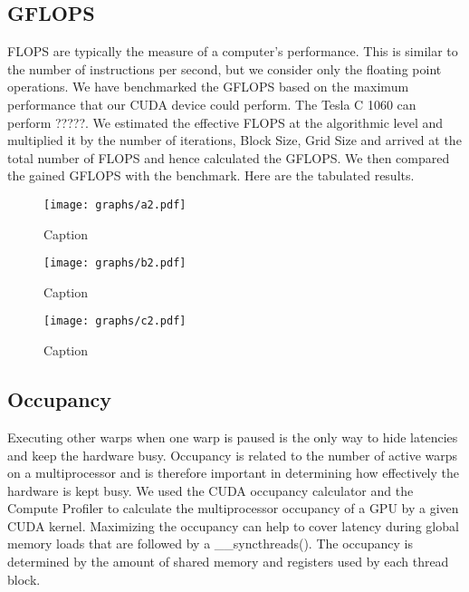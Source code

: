 \documentclass[10pt, twocolumn]{article}
\begin{document}
    \subsection{GFLOPS}
    FLOPS are typically the measure of a computer’s performance.
    This is similar to the number of instructions per second, but we consider only the floating point operations.
    We have benchmarked the GFLOPS based on the maximum performance that our CUDA device could perform.
    The Tesla C 1060 can perform ?????.
    We estimated the effective FLOPS at the algorithmic level and multiplied it by the number of iterations, Block Size, Grid Size and arrived at the total number of FLOPS and hence calculated the GFLOPS.
    We then compared the gained GFLOPS with the benchmark.
    Here are the tabulated results.

    \begin{center}
    \begin{figure}
        \texttt{[image: graphs/a2.pdf]}
        \caption{Caption}
        \label{fig:gflops1}
    \end{figure}
    \end{center}

    \begin{center}
    \begin{figure}
        \texttt{[image: graphs/b2.pdf]}
        \caption{Caption}
        \label{fig:gflops2}
    \end{figure}
    \end{center}

    \begin{center}
    \begin{figure}
        \texttt{[image: graphs/c2.pdf]}
        \caption{Caption}
        \label{fig:gflops3}
    \end{figure}
    \end{center}

    \subsection{Occupancy}
    Executing other warps when one warp is paused is the only way to hide latencies and keep the hardware busy.
    Occupancy is related to the number of active warps on a multiprocessor and is therefore important in determining how effectively the hardware is kept busy.
    We used the CUDA occupancy calculator and the Compute Profiler  to calculate the multiprocessor occupancy of a GPU by a given CUDA kernel.
    Maximizing the occupancy can help to cover latency during global memory loads that are followed by a \_\_syncthreads().
    The occupancy is determined by the amount of shared memory and registers used by each thread block.
\end{document}
